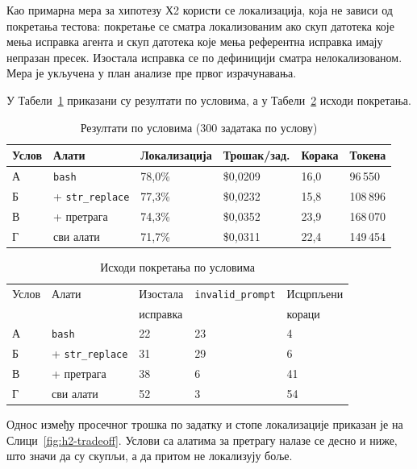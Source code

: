 \documentclass[12pt,a4paper]{report}
\newcommand{\tabelalevo}{\setstretch{1}\fontsize{11bp}{14.5bp}\selectfont
	\hspace*{\dimexpr-\tabcolsep-\arrayrulewidth+0.4bp\relax}}
\begin{document}
	Као примарна мера за хипотезу Х2 користи се локализација, која не зависи од
	покретања тестова: покретање се сматра
	локализованим ако скуп датотека које мења исправка агента и скуп датотека које
	мења референтна исправка имају непразан пресек. Изостала исправка се по дефиницији
	сматра нелокализованом. Мера је укључена у план анализе пре првог
	израчунавања.
	
	У Табели~\ref{tab:rezultati} приказани су резултати по условима, а у
	Табели~\ref{tab:ishodi} исходи покретања.
	
	\begin{table}[H]
		\caption{Резултати по условима (300 задатака по услову)}
		\label{tab:rezultati}
		\tabelalevo
		\begin{tabular}{|l|l|l|l|l|l|}
			\hline
			Услов & Алати & Локализација & Трошак/зад. & Корака & Токена \\
			\hline
			А & \texttt{bash} & 78,0\% & \$0,0209 & 16,0 & 96\,550 \\
			\hline
			Б & + \texttt{str\_replace} & 77,3\% & \$0,0232 & 15,8 & 108\,896 \\
			\hline
			В & + претрага & 74,3\% & \$0,0352 & 23,9 & 168\,070 \\
			\hline
			Г & сви алати & 71,7\% & \$0,0311 & 22,4 & 149\,454 \\
			\hline
		\end{tabular}
	\end{table}
	
	\begin{table}[H]
		\caption{Исходи покретања по условима}
		\label{tab:ishodi}
		\tabelalevo
		\begin{tabular}{|l|l|l|l|l|}
			\hline
			Услов & Алати & Изостала & \texttt{invalid\_prompt} & Исцрпљени \\
			 &  & исправка &  & кораци \\
			\hline
			А & \texttt{bash} & 22 & 23 & 4 \\
			\hline
			Б & + \texttt{str\_replace} & 31 & 29 & 6 \\
			\hline
			В & + претрага & 38 & 6 & 41 \\
			\hline
			Г & сви алати & 52 & 3 & 54 \\
			\hline
		\end{tabular}
	\end{table}
	
	Однос између просечног трошка по задатку и стопе локализације приказан је на
	Слици~\ref{fig:h2-tradeoff}. Услови са алатима за претрагу налазе се десно и
	ниже, што значи да су скупљи, а да притом не локализују боље.
	
\end{document}
